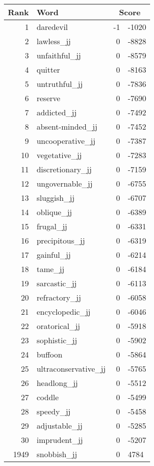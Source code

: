 \begin{longtable}[!htbp]{| rlr@{.}l |}
    \hline
    \textbf{Rank} & \textbf{Word} & \multicolumn{2}{c|}{\textbf{Score}} \\
    \hline
    \endhead
    1 & daredevil & -1 & -1020 \\
    2 & lawless\_jj & 0 & -8828 \\
    3 & unfaithful\_jj & 0 & -8579 \\
    4 & quitter & 0 & -8163 \\
    5 & untruthful\_jj & 0 & -7836 \\
    6 & reserve & 0 & -7690 \\
    7 & addicted\_jj & 0 & -7492 \\
    8 & absent-minded\_jj & 0 & -7452 \\
    9 & uncooperative\_jj & 0 & -7387 \\
    10 & vegetative\_jj & 0 & -7283 \\
    11 & discretionary\_jj & 0 & -7159 \\
    12 & ungovernable\_jj & 0 & -6755 \\
    13 & sluggish\_jj & 0 & -6707 \\
    14 & oblique\_jj & 0 & -6389 \\
    15 & frugal\_jj & 0 & -6331 \\
    16 & precipitous\_jj & 0 & -6319 \\
    17 & gainful\_jj & 0 & -6214 \\
    18 & tame\_jj & 0 & -6184 \\
    19 & sarcastic\_jj & 0 & -6113 \\
    20 & refractory\_jj & 0 & -6058 \\
    21 & encyclopedic\_jj & 0 & -6046 \\
    22 & oratorical\_jj & 0 & -5918 \\
    23 & sophistic\_jj & 0 & -5902 \\
    24 & buffoon & 0 & -5864 \\
    25 & ultraconservative\_jj & 0 & -5765 \\
    26 & headlong\_jj & 0 & -5512 \\
    27 & coddle & 0 & -5499 \\
    28 & speedy\_jj & 0 & -5458 \\
    29 & adjustable\_jj & 0 & -5285 \\
    30 & imprudent\_jj & 0 & -5207 \\
    1949 & snobbish\_jj & 0 & 4784 \\

\end{longtable}
